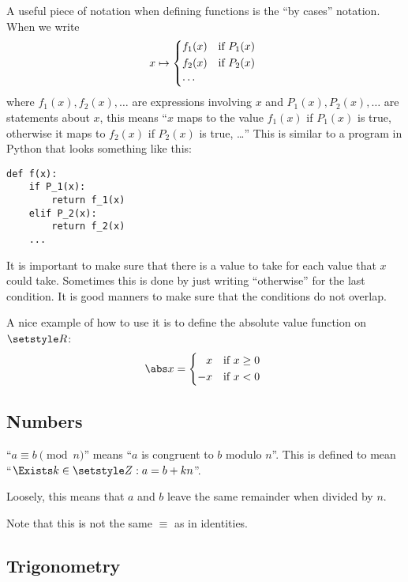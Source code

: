 A useful piece of notation when defining functions is the ``by cases'' notation.
When we write
\begin{equation*}
 x \mapsto
 \begin{cases*}
  f_1(x) & if \(P_1(x)\) \\
  f_2(x) & if \(P_2(x)\) \\
  \dotsb
 \end{cases*}
\end{equation*}
where \(f_1(x), f_2(x), \dotsc\) are expressions involving \(x\) and
\(P_1(x), P_2(x), \dotsc\) are statements about \(x\), this means
``\(x\) maps to the value \(f_1(x)\) if \(P_1(x)\) is true, otherwise it maps to
\(f_2(x)\) if \(P_2(x)\) is true, \dots''
This is similar to a program in Python that looks something like this:
\begin{verbatim}
def f(x):
    if P_1(x):
        return f_1(x)
    elif P_2(x):
        return f_2(x)
    ...
\end{verbatim}
It is important to make sure that there is a value to take for each value that
\(x\) could take. Sometimes this is done by just writing ``otherwise'' for the
last condition. It is good manners to make sure that the conditions do not
overlap.

A nice example of how to use it is to define the absolute value function on
\(\Reals\):
\begin{equation*}
 \abs x =
 \begin{cases*}
  \phantom{-}x & if \(x \ge 0\) \\
  -x & if \(x < 0\)
 \end{cases*}
\end{equation*}

\subsection{Numbers}

``\(a \equiv b \pmod n\)'' means ``\(a\) is congruent to \(b\) modulo \(n\)''.
This is defined to mean \\
``\(\Exists k \in \Integers : a = b + kn\)''.

Loosely, this means that \(a\) and \(b\) leave the same remainder when divided
by \(n\).

Note that this is not the same \(\equiv\) as in identities.

\subsection{Trigonometry}

